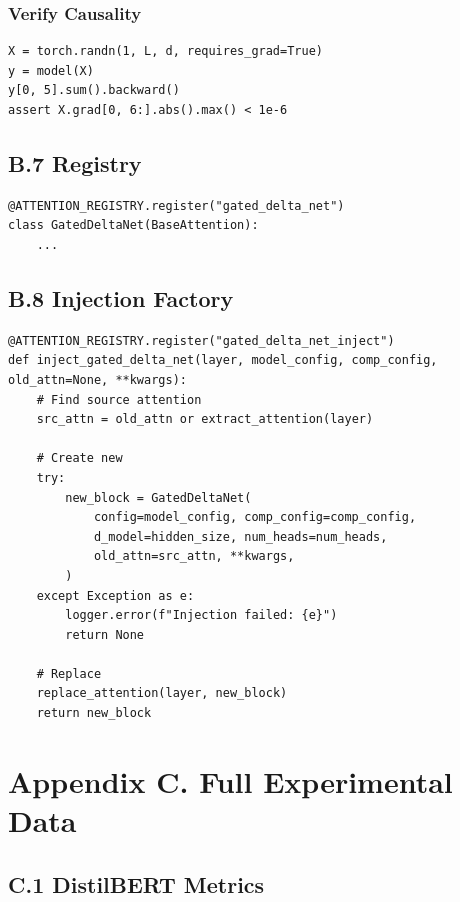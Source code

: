 \subsubsection{Verify Causality}

\begin{lstlisting}
X = torch.randn(1, L, d, requires_grad=True)
y = model(X)
y[0, 5].sum().backward()
assert X.grad[0, 6:].abs().max() < 1e-6
\end{lstlisting}

\subsection{B.7 Registry}

\begin{lstlisting}
@ATTENTION_REGISTRY.register("gated_delta_net")
class GatedDeltaNet(BaseAttention):
    ...
\end{lstlisting}

\subsection{B.8 Injection Factory}

\begin{lstlisting}
@ATTENTION_REGISTRY.register("gated_delta_net_inject")
def inject_gated_delta_net(layer, model_config, comp_config, old_attn=None, **kwargs):
    # Find source attention
    src_attn = old_attn or extract_attention(layer)
    
    # Create new
    try:
        new_block = GatedDeltaNet(
            config=model_config, comp_config=comp_config,
            d_model=hidden_size, num_heads=num_heads,
            old_attn=src_attn, **kwargs,
        )
    except Exception as e:
        logger.error(f"Injection failed: {e}")
        return None
    
    # Replace
    replace_attention(layer, new_block)
    return new_block
\end{lstlisting}




\section{Appendix C. Full Experimental Data}

\subsection{C.1 DistilBERT Metrics}

